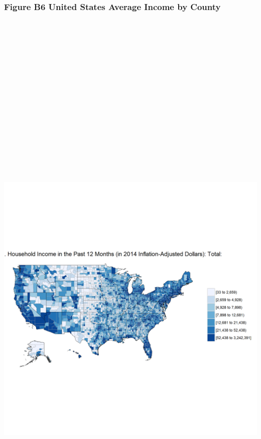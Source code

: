 \documentclass[]{article}
\begin{document}
\newpage

\subsubsection{Figure B6 United States Average Income by
County}\label{figure-b6-united-states-average-income-by-county}

\section{\texorpdfstring{\protect\includegraphics[height=12.50000in]{images/county_income.png}}{US Average Income by County}}\label{us-average-income-by-county}
\end{document}
